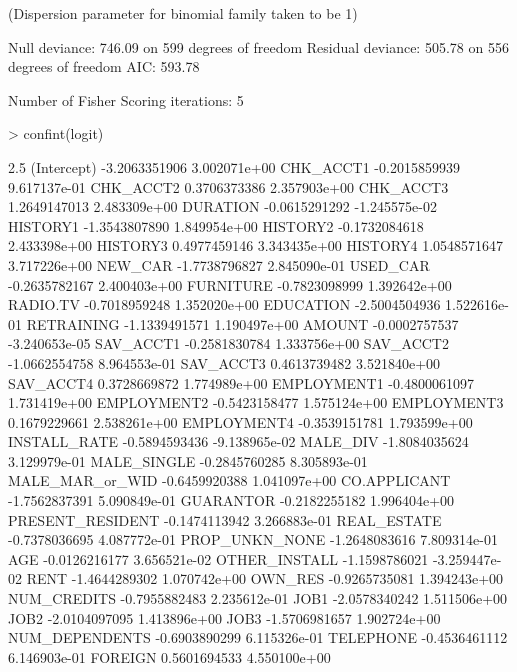 \documentclass{article}
\begin{document}
\begin{Schunk}
\begin{Soutput}
(Dispersion parameter for binomial family taken to be 1)

    Null deviance: 746.09  on 599  degrees of freedom
Residual deviance: 505.78  on 556  degrees of freedom
AIC: 593.78

Number of Fisher Scoring iterations: 5
\end{Soutput}
\begin{Sinput}
> confint(logit)
\end{Sinput}
\begin{Soutput}
                         2.5 %
(Intercept)      -3.2063351906  3.002071e+00
CHK_ACCT1        -0.2015859939  9.617137e-01
CHK_ACCT2         0.3706373386  2.357903e+00
CHK_ACCT3         1.2649147013  2.483309e+00
DURATION         -0.0615291292 -1.245575e-02
HISTORY1         -1.3543807890  1.849954e+00
HISTORY2         -0.1732084618  2.433398e+00
HISTORY3          0.4977459146  3.343435e+00
HISTORY4          1.0548571647  3.717226e+00
NEW_CAR          -1.7738796827  2.845090e-01
USED_CAR         -0.2635782167  2.400403e+00
FURNITURE        -0.7823098999  1.392642e+00
RADIO.TV         -0.7018959248  1.352020e+00
EDUCATION        -2.5004504936  1.522616e-01
RETRAINING       -1.1339491571  1.190497e+00
AMOUNT           -0.0002757537 -3.240653e-05
SAV_ACCT1        -0.2581830784  1.333756e+00
SAV_ACCT2        -1.0662554758  8.964553e-01
SAV_ACCT3         0.4613739482  3.521840e+00
SAV_ACCT4         0.3728669872  1.774989e+00
EMPLOYMENT1      -0.4800061097  1.731419e+00
EMPLOYMENT2      -0.5423158477  1.575124e+00
EMPLOYMENT3       0.1679229661  2.538261e+00
EMPLOYMENT4      -0.3539151781  1.793599e+00
INSTALL_RATE     -0.5894593436 -9.138965e-02
MALE_DIV         -1.8084035624  3.129979e-01
MALE_SINGLE      -0.2845760285  8.305893e-01
MALE_MAR_or_WID  -0.6459920388  1.041097e+00
CO.APPLICANT     -1.7562837391  5.090849e-01
GUARANTOR        -0.2182255182  1.996404e+00
PRESENT_RESIDENT -0.1474113942  3.266883e-01
REAL_ESTATE      -0.7378036695  4.087772e-01
PROP_UNKN_NONE   -1.2648083616  7.809314e-01
AGE              -0.0126216177  3.656521e-02
OTHER_INSTALL    -1.1598786021 -3.259447e-02
RENT             -1.4644289302  1.070742e+00
OWN_RES          -0.9265735081  1.394243e+00
NUM_CREDITS      -0.7955882483  2.235612e-01
JOB1             -2.0578340242  1.511506e+00
JOB2             -2.0104097095  1.413896e+00
JOB3             -1.5706981657  1.902724e+00
NUM_DEPENDENTS   -0.6903890299  6.115326e-01
TELEPHONE        -0.4536461112  6.146903e-01
FOREIGN           0.5601694533  4.550100e+00
\end{Soutput}

\end{Schunk}
\end{document}
